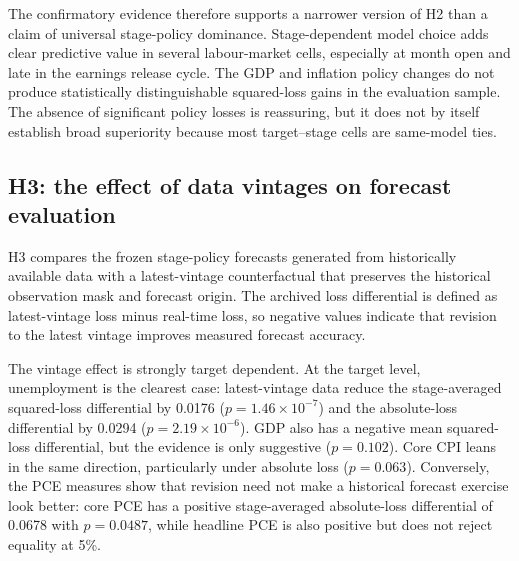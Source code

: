 The confirmatory evidence therefore supports a narrower version of H2 than a
claim of universal stage-policy dominance.  Stage-dependent model choice adds
clear predictive value in several labour-market cells, especially at month
open and late in the earnings release cycle.  The GDP and inflation policy
changes do not produce statistically distinguishable squared-loss gains in
the evaluation sample.  The absence of significant policy losses is
reassuring, but it does not by itself establish broad superiority because
most target--stage cells are same-model ties.

\subsection{H3: the effect of data vintages on forecast evaluation}
\label{subsec:h3_results}

H3 compares the frozen stage-policy forecasts generated from historically
available data with a latest-vintage counterfactual that preserves the
historical observation mask and forecast origin.  The archived loss
differential is defined as latest-vintage loss minus real-time loss, so
negative values indicate that revision to the latest vintage improves
measured forecast accuracy.

The vintage effect is strongly target dependent.  At the target level,
unemployment is the clearest case: latest-vintage data reduce the
stage-averaged squared-loss differential by 0.0176
(\(p=1.46\times10^{-7}\)) and the absolute-loss differential by 0.0294
(\(p=2.19\times10^{-6}\)).  GDP also has a negative mean squared-loss
differential, but the evidence is only suggestive (\(p=0.102\)).  Core CPI
leans in the same direction, particularly under absolute loss
(\(p=0.063\)).  Conversely, the PCE measures show that revision need not make
a historical forecast exercise look better: core PCE has a positive
stage-averaged absolute-loss differential of 0.0678 with \(p=0.0487\), while
headline PCE is also positive but does not reject equality at 5\%.

